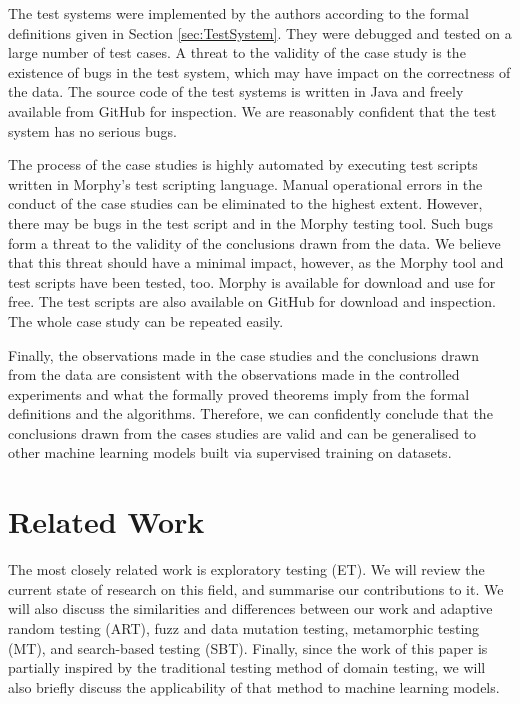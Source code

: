 \documentclass[preprint,1p,authoryear,times]{elsarticle}
\begin{document}
The test systems were implemented by the authors according to the formal definitions given in Section \ref{sec:TestSystem}. They were debugged and tested on a large number of test cases. A threat to the validity of the case study is the existence of bugs in the test system, which may have impact on the correctness of the data. The source code of the test systems is written in Java and freely available from GitHub for inspection. We are reasonably confident that the test system has no serious bugs. 

The process of the case studies is highly automated by executing test scripts written in Morphy's test scripting language. Manual operational errors in the conduct of the case studies can be eliminated to the highest extent. However, there may be bugs in the test script and in the Morphy testing tool. Such bugs form a threat to the validity of the conclusions drawn from the data. We believe that this threat should have a minimal impact, however, as the Morphy tool and test scripts have been tested, too. Morphy is available for download and use for free. The test scripts are also available on GitHub for download and inspection. The whole case study can be repeated easily. 

Finally, the observations made in the case studies and the conclusions drawn from the data are consistent with the observations made in the controlled experiments and what the formally proved theorems imply from the formal definitions and the algorithms. Therefore, we can confidently conclude that the conclusions drawn from the cases studies are valid and can be generalised to other machine learning models built via supervised training on datasets. 

\section{Related Work}\label{sec:RelatedWork}

The most closely related work is exploratory testing (ET). We will review the current state of research on this field, and summarise our contributions to it. We will also discuss the similarities and differences between our work and adaptive random testing (ART), fuzz and data mutation testing, metamorphic testing (MT), and search-based testing (SBT). Finally, since the work of this paper is partially inspired by the traditional testing method of domain testing, we will also briefly discuss the applicability of that method to machine learning models. 
\end{document}
